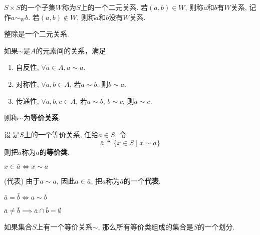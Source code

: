 \begin{Definition}
$S \times S$的一个子集$W$称为$S$上的一个二元关系. 若$(a, b) \in W$, 则称$a$和$b$有$W$关系, 记作$a \sim_W b$.
若$(a, b) \notin W$, 则称$a$和$b$没有$W$关系.
\end{Definition}

\begin{Note}
整除是一个二元关系.
\end{Note}

\begin{Definition}[等价关系]
如果$\sim$是$A$的元素间的关系，满足 
\begin{enumerate}[(1)]
\item 自反性, $\forall a \in A, a \sim a$.
\item 对称性, $\forall a, b \in A$, 若$a \sim b$, 则$b \sim a$.
\item 传递性, $\forall a, b, c \in A$, 若$a \sim b$, $b\sim c$, 则$a \sim c$.
\end{enumerate}
则称$\sim$为\textbf{等价关系}. 
\end{Definition}

\begin{Definition}
设$~$是$S$上的一个等价关系, 任给$a \in S$, 令
$$
\bar{a} \triangleq \{ x \in S \mid x \sim a\}
$$
则把$\bar{a}$称为$a$的\textbf{等价类}.
\end{Definition}

\begin{Note}
$x \in \bar{a} \iff x \sim a$
\end{Note}

\begin{Note}(代表)
由于$a \sim a$, 因此$a \in \bar{a}$, 把$a$称为$\bar{a}$的一个\textbf{代表}.
\end{Note}

\begin{Property}
$\bar{a} = \bar{b} \iff a \sim b$
\end{Property}

\begin{Property}
$\bar{a} \neq \bar{b} \implies \bar{a} \cap \bar{b} = \emptyset$
\end{Property}

\begin{Theorem}
如果集合$S$上有一个等价关系$\sim$, 那么所有等价类组成的集合是$S$的一个划分.
\end{Theorem}


